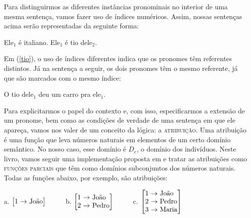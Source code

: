 Para distinguirmos as diferentes instâncias pronominais no
interior de uma mesma sentença, vamos fazer uso de índices
numéricos. Assim, nossas sentenças acima serão representadas da
seguinte forma:

\begin{exe}
\ex Ele$_{1}$ é italiano.\label{ita}
\ex Ele$_{1}$ é tio dele$_{2}$.\label{tio}
\end{exe}

Em (\ref{tio}), o uso de índices diferentes indica que os pronomes
têm referentes distintos. Já na sentença a seguir, os dois pronomes
têm o mesmo referente, já que são marcados com o mesmo índice:

\begin{exe}
\ex O tio dele$_{1}$ deu um carro pra ele$_{1}$.
\end{exe}

Para explicitarmos o papel do contexto e, com isso, especificarmos a extensão de um pronome, bem como as condições de verdade de uma sentença em que ele apareça, vamos nos valer de um conceito da lógica: a \textsc{atribuição}. Uma atribuição é uma função que leva números naturais em elementos de um certo domínio semântico. No nosso caso, esse domínio é $D_{e}$, o domínio dos indivíduos. Neste livro, vamos seguir uma implementação proposta em \cite{heikra98} e tratar as atribuições como \textsc{funções parciais} que têm como domínios subconjuntos dos números naturais. Todas as funções abaixo, por exemplo, são atribuições:

\begin{exe}
	
	\ex a. $\left[%
	\begin{array}{@{}c@{\ }l@{\ }l@{}}%
	1 & \rightarrow& \text{João} \\
	\end{array}\right]$
	\ \ \ \ \ b. $\left[%
	\begin{array}{@{}c@{\ }l@{\ }l@{}}%
	1 & \rightarrow& \text{João} \\
	2 & \rightarrow & \text{Pedro} \\
	\end{array}\right]$
	\ \ \ \ \ c. $\left[%
	\begin{array}{@{}c@{\ }l@{\ }l@{}}%
	1 & \rightarrow& \text{João} \\
	2 & \rightarrow & \text{Pedro} \\
	3 & \rightarrow & \text{Maria} \\
	\end{array}\right]$
	
	\label{as}
\end{exe}


